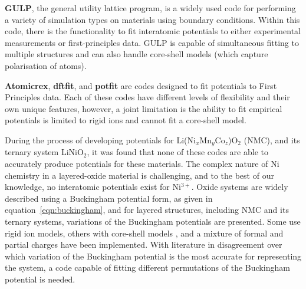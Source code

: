 \documentclass[../main.tex]{subfiles}
\begin{document}
\textbf{GULP}, \cite{GULP} the general utility lattice program, is a widely used code for performing a variety of simulation types on materials using boundary conditions. \cite{gale_gulp_1997} Within this code, there is the functionality to fit interatomic potentials to either experimental measurements or first-principles data.\cite{gale_empirical_1996} GULP is capable of simultaneous fitting to multiple structures and can also handle core-shell models (which capture polarisation of atoms).

\textbf{Atomicrex}, \cite{Stukowski_2017} \textbf{dftfit}, \cite{dftfit} and \textbf{potfit} \cite{wen_kim-compliant_2017, potfit} are codes designed to fit potentials to First Principles data. Each of these codes have different levels of flexibility and their own unique features, however, a joint limitation is the ability to fit empirical potentials is limited to rigid ions and cannot fit a core-shell model.

During the process of developing potentials for Li(Ni$_x$Mn$_y$Co$_z$)O$_2$ (NMC), and its ternary system LiNiO$_2$, it was found that none of these codes are able to accurately produce potentials for these materials. The complex nature of Ni chemistry in a layered-oxide material is challenging, and to the best of our knowledge, no interatomic potentials exist for Ni$^{3+}$. Oxide systems are widely described using a Buckingham potential form, as given in equation~\ref{eqn:buckingham}, and for layered structures, including NMC and its ternary systems, variations of the Buckingham potentials are presented. Some use rigid ion models,\cite{Lewis_1985, Ledwaba2020, Sayle2005, Dawson0214} others with core-shell models \cite{Hart1998, Fisher2010, Lewis_1985,Ammundsen1999, Kerisit2014, He2019,lee2012atomistic}, and a mixture of formal and partial charges have been implemented. With literature in disagreement over which variation of the Buckingham potential is the most accurate for representing the system, a code capable of fitting different permutations of the Buckingham potential is needed.
\end{document}
